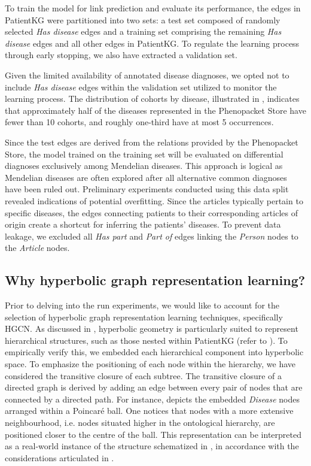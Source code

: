 To train the model for link prediction and evaluate its performance, the edges in PatientKG were partitioned into two sets: a test set composed of randomly selected \emph{Has disease} edges and a training set comprising the remaining \emph{Has disease} edges and all other edges in PatientKG. To regulate the learning process through early stopping, we also have extracted a validation set.

Given the limited availability of annotated disease diagnoses, we opted not to include \emph{Has disease} edges within the validation set utilized to monitor the learning process. The distribution of cohorts by disease, illustrated in , indicates that approximately half of the diseases represented in the Phenopacket Store have fewer than 10 cohorts, and roughly one-third have at most 5 occurrences.

Since the test edges are derived from the relations provided by the Phenopacket Store, the model trained on the training set will be evaluated on differential diagnoses exclusively among Mendelian diseases. This approach is logical as Mendelian diseases are often explored after all alternative common diagnoses have been ruled out. Preliminary experiments conducted using this data split revealed indications of potential overfitting. Since the articles typically pertain to specific diseases, the edges connecting patients to their corresponding articles of origin create a shortcut for inferring the patients' diseases. To prevent data leakage, we excluded all \emph{Has part} and \emph{Part of} edges linking the \emph{Person} nodes to the \emph{Article} nodes.

\subsection{Why hyperbolic graph representation learning?}\label{sec:hypPatientKG}
Prior to delving into the run experiments, we would like to account for the selection of hyperbolic graph representation learning techniques, specifically HGCN. As discussed in , hyperbolic geometry is particularly suited to represent hierarchical structures, such as those nested within PatientKG (refer to ). To empirically verify this, we embedded each hierarchical component into hyperbolic space. To emphasize the positioning of each node within the hierarchy, we have considered the transitive closure of each subtree. The transitive closure of a directed graph is derived by adding an edge between every pair of nodes that are connected by a directed path. For instance,  depicts the embedded \emph{Disease} nodes arranged within a Poincaré ball. One notices that nodes with a more extensive neighbourhood, i.e. nodes situated higher in the ontological hierarchy, are positioned closer to the centre of the ball. This representation can be interpreted as a real-world instance of the structure schematized in , in accordance with the considerations articulated in . 


